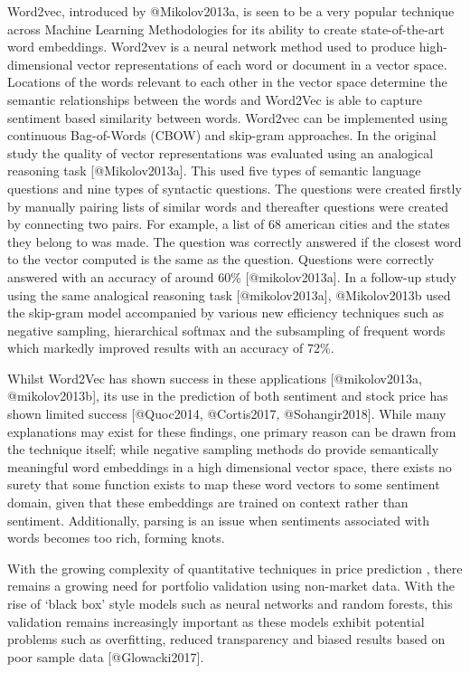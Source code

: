 \documentclass[11pt]{article}
\begin{document}
Word2vec, introduced by @Mikolov2013a, is seen to be a very popular
technique across Machine Learning Methodologies for its ability to
create state-of-the-art word embeddings. Word2vev is a neural network
method used to produce high-dimensional vector representations of each
word or document in a vector space. Locations of the words relevant to
each other in the vector space determine the semantic relationships
between the words and Word2Vec is able to capture sentiment based
similarity between words. Word2vec can be implemented using continuous
Bag-of-Words (CBOW) and skip-gram approaches. In the original study the
quality of vector representations was evaluated using an analogical
reasoning task {[}@Mikolov2013a{]}. This used five types of semantic
language questions and nine types of syntactic questions. The questions
were created firstly by manually pairing lists of similar words and
thereafter questions were created by connecting two pairs. For example,
a list of 68 american cities and the states they belong to was made. The
question was correctly answered if the closest word to the vector
computed is the same as the question. Questions were correctly answered
with an accuracy of around 60\% {[}@mikolov2013a{]}. In a follow-up
study using the same analogical reasoning task {[}@mikolov2013a{]},
@Mikolov2013b used the skip-gram model accompanied by various new
efficiency techniques such as negative sampling, hierarchical softmax
and the subsampling of frequent words which markedly improved results
with an accuracy of 72\%.

Whilst Word2Vec has shown success in these applications
{[}@mikolov2013a, @mikolov2013b{]}, its use in the prediction of both
sentiment and stock price has shown limited success {[}@Quoc2014,
@Cortis2017, @Sohangir2018{]}. While many explanations may exist for
these findings, one primary reason can be drawn from the technique
itself; while negative sampling methods do provide semantically
meaningful word embeddings in a high dimensional vector space, there
exists no surety that some function exists to map these word vectors to
some sentiment domain, given that these embeddings are trained on
context rather than sentiment. Additionally, parsing is an issue when
sentiments associated with words becomes too rich, forming knots.

With the growing complexity of quantitative techniques in price
prediction , there remains a growing need for portfolio validation using
non-market data. With the rise of `black box' style models such as
neural networks and random forests, this validation remains increasingly
important as these models exhibit potential problems such as
overfitting, reduced transparency and biased results based on poor
sample data {[}@Glowacki2017{]}.
\end{document}
